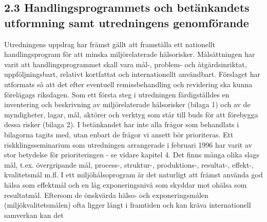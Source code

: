 \subsection*{2.3 Handlingsprogrammets och betänkandets utformning samt utredningens genomförande}
Utredningens uppdrag har främst gällt att framställa ett nationellt handlingsprogram för att minska miljörelaterade hälsorisker. Målsättningen har varit att handlingsprogrammet skall vara mål-, problem- och åtgärdsinriktat, uppföljningsbart, relativt kortfattat och internationellt användbart. Förslaget har utformats så att det efter eventuell remissbehandling och revidering ska kunna förelägags riksdagen.
Som ett första steg i utredningen färdigställdes en inventering och beskrivning av miljörelaterade hälsorisker (bilaga 1) och av de myndigheter, lagar, mål, aktörer och verktyg som står till buds för att förebygga dessa risker (bilaga 2). I betänkandet har inte alla frågor som behandlats i bilagorna tagits med, utan enbart de frågor vi ansett bör prioriteras.
Ett riskklingsseminarium som utredningen arrangerade i februari 1996 har varit av stor betydelse för prioriteringen - se vidare kapitel 4.
Det finns många olika slags mål, t.ex. övergripande mål, process-, struktur-, produktions-, resultat-, effekt-, kvalitetsmål m.fl. I ett miljöhålsoprogram är det naturligt att främst använda god hälsa som effektmål och en låg exponeringsnivå som skyddar mot ohälsa som resultatmål. Eftersom de önskvärda hälso- och exponeringsmålen (miljökvalitetsmålen) ofta ligger långt i framtiden och kan kräva internationell samverkan kan det

